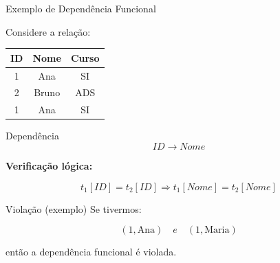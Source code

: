 \documentclass[9pt]{beamer}
\begin{document}
\begin{frame}{Exemplo de Dependência Funcional}

\small

Considere a relação:

\vspace{0.3cm}

\begin{tabular}{|c|c|c|}
\hline
ID & Nome & Curso \\ \hline
1 & Ana & SI \\ \hline
2 & Bruno & ADS \\ \hline
1 & Ana & SI \\ \hline
\end{tabular}

\vspace{0.4cm}

\begin{block}{Dependência}
\[
ID \rightarrow Nome
\]
\end{block}

\vspace{0.3cm}

\textbf{Verificação lógica:}

\[
t_1[ID] = t_2[ID] \Rightarrow t_1[Nome] = t_2[Nome]
\]

\vspace{0.4cm}

\begin{alertblock}{Violação (exemplo)}
Se tivermos:

\[
(1, \text{Ana}) \quad e \quad (1, \text{Maria})
\]

então a dependência funcional é violada.

\end{alertblock}

\end{frame}
\end{document}
